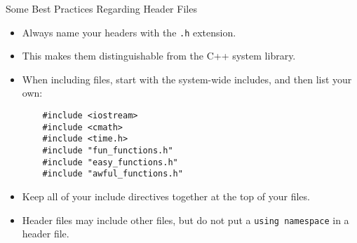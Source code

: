 \documentclass[]{beamer}
\begin{document}
\begin{frame}[fragile]{Some Best Practices Regarding Header Files}
    \begin{itemize}[<+->]
        \item Always name your headers with the \texttt{.h} extension.
        \item This makes them distinguishable from the C++ system
            library.
        \item When including files, start with the system-wide
            includes, and then list your own:
            \begin{BVerbatim}
    #include <iostream>
    #include <cmath>
    #include <time.h>
    #include "fun_functions.h"
    #include "easy_functions.h"
    #include "awful_functions.h"
            \end{BVerbatim}
        \item Keep all of your include directives together at the top
            of your files.
        \item Header files may include other files, but do not put
            a \texttt{using namespace} in a header file.  
    \end{itemize}
\end{frame}
\end{document}
